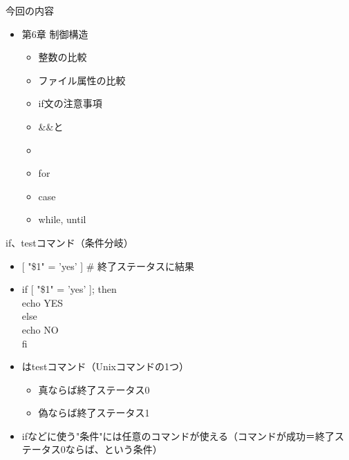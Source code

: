 \documentclass[12pt,aspectratio=169]{beamer}
\begin{document}
\begin{frame}{今回の内容}

  \begin{itemize}
    \item 第6章 制御構造
    \begin{itemize}
      \item 整数の比較
      \item ファイル属性の比較
      \item if文の注意事項
      \item \&\&と\textbar\textbar
      \item \lbrack\lbrack\ \rbrack\rbrack
      \item for
      \item case
      \item while, until
    \end{itemize}

  \end{itemize}

\end{frame}

\begin{frame}{if、testコマンド（条件分岐）}

  \begin{itemize}
    \item {[ "\$1" = 'yes' ] \# 終了ステータスに結果}
    \item
      {if [ "\$1" = 'yes' ]; then \\
        \hspace{0.5cm}echo YES \\
      else \\
        \hspace{0.5cm}echo NO \\
      fi}
    \vspace{0.5cm}
    \item \lbrack はtestコマンド（Unixコマンドの1つ）
      \begin{itemize}
        \item 真ならば終了ステータス0
        \item 偽ならば終了ステータス1
      \end{itemize}
    \item ifなどに使う"条件"には任意のコマンドが使える（コマンドが成功＝終了ステータス0ならば、という条件）
  \end{itemize}
\end{frame}
\end{document}
